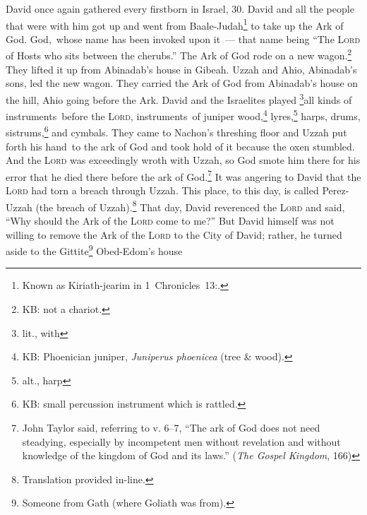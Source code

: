 
\begin{inparaenum}
     David once again gathered every firstborn in Israel, 30.%
     David and all the people that were with him got up and went from Baale-Judah\footnote{Known as Kiriath-jearim in 1~Chronicles~13\thinspace:.} to take up the Ark of God. God,\understood\ whose name has been invoked upon it~--- that name being ``The \textsc{Lord} of Hosts who sits between the cherubs.''%
     The Ark of God rode on a new wagon.\footnote{KB: not a chariot.} They lifted it up from Abinadab's house in Gibeah. Uzzah and Ahio, Abinadab's sons, led the new wagon.%
     They carried the Ark of God from Abinadab's house on the hill, Ahio going before the Ark.%
     David and the Israelites played \footnote{lit., with}all kinds of instruments\understood\ before the \textsc{Lord}, instruments\understood\ of juniper wood,\footnote{KB: Phoenician juniper, \textit{Juniperus phoenicea} (tree \& wood).} lyres,\footnote{alt., harp} harps, drums, sistrums,\footnote{KB: small percussion instrument which is rattled.} and cymbals.%
     They came to Nachon's threshing floor and Uzzah put forth his hand\understood\ to the ark of God and took hold of it because the oxen stumbled.%
     And the \textsc{Lord} was exceedingly wroth with Uzzah, so God smote him there for his error that he died there before the ark of God.\footnote{John Taylor said, referring to v. 6--7, ``The ark of God does not need steadying, especially by incompetent men without revelation and without knowledge of the kingdom of God and its laws.'' (\textit{The Gospel Kingdom}, 166)}%
     It was angering to David that the \textsc{Lord} had torn a breach through Uzzah. This place, to this day, is called Perez-Uzzah (the breach of Uzzah).\footnote{Translation provided in-line.}%
     That day, David reverenced the \textsc{Lord} and said, ``Why should the Ark of the \textsc{Lord} come to me?''%
     But David himself was not willing to remove the Ark of the \textsc{Lord} to the City of David; rather, he turned aside to the Gittite\footnote{Someone from Gath (where Goliath was from).} Obed-Edom's house%

\end{inparaenum}
